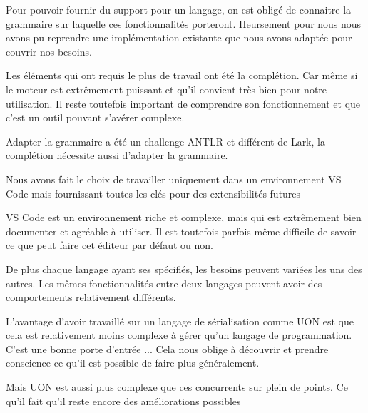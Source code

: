 \documentclass[
    iict, %
    il, %
]{heig-tb}
\begin{document}







Pour pouvoir fournir du support pour un langage, on est obligé de connaitre la grammaire sur laquelle ces fonctionnalités porteront.
Heursement pour nous nous avons pu reprendre une implémentation existante que nous avons adaptée pour couvrir nos besoins.

Les éléments qui ont requis le plus de travail ont été la complétion.
Car même si le moteur est extrêmement puissant et qu'il convient très bien pour notre utilisation. Il reste toutefois important de comprendre son fonctionnement et que c'est un outil pouvant s'avérer complexe.

Adapter la grammaire a été un challenge ANTLR et différent de Lark, la complétion nécessite aussi d'adapter la grammaire.


Nous avons fait le choix de travailler uniquement dans un environnement VS Code mais fournissant toutes les clés pour des extensibilités futures

VS Code est un environnement riche et complexe, mais qui est extrêmement bien documenter et agréable à utiliser.
Il est toutefois parfois même difficile de savoir ce que peut faire cet éditeur par défaut ou non.

De plus chaque langage ayant ses spécifiés, les besoins peuvent variées les uns des autres.
Les mêmes fonctionnalités entre deux langages peuvent avoir des comportements relativement différents.

L'avantage d'avoir travaillé sur un langage de sérialisation comme UON est que cela est relativement moins complexe à gérer qu'un langage de programmation.
C'est une bonne porte d'entrée ...
Cela nous oblige à découvrir et prendre conscience ce qu'il est possible de faire plus généralement.

Mais UON est aussi plus complexe que ces concurrents sur plein de points.
Ce qu'il fait qu'il reste encore des améliorations possibles
\end{document}
